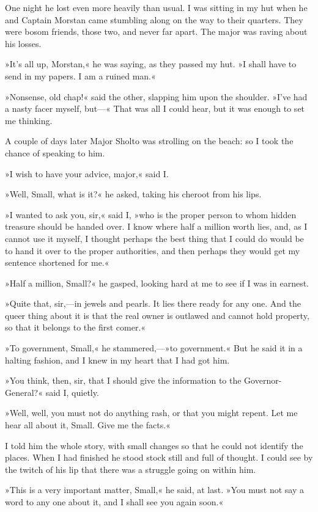 One night he lost even more heavily than usual. I was sitting in my hut when he and Captain Morstan came stumbling along on the way to their quarters. They were bosom friends, those two, and never far apart. The major was raving about his losses.

»It's all up, Morstan,« he was saying, as they passed my hut. »I shall have to send in my papers. I am a ruined man.«

»Nonsense, old chap!« said the other, slapping him upon the shoulder. »I've had a nasty facer myself, but—« That was all I could hear, but it was enough to set me thinking.

A couple of days later Major Sholto was strolling on the beach: so I took the chance of speaking to him.

»I wish to have your advice, major,« said I.

»Well, Small, what is it?« he asked, taking his cheroot from his lips.

»I wanted to ask you, sir,« said I, »who is the proper person to whom hidden treasure should be handed over. I know where half a million worth lies, and, as I cannot use it myself, I thought perhaps the best thing that I could do would be to hand it over to the proper authorities, and then perhaps they would get my sentence shortened for me.«

»Half a million, Small?« he gasped, looking hard at me to see if I was in earnest.

»Quite that, sir,—in jewels and pearls. It lies there ready for any one. And the queer thing about it is that the real owner is outlawed and cannot hold property, so that it belongs to the first comer.«

»To government, Small,« he stammered,—»to government.« But he said it in a halting fashion, and I knew in my heart that I had got him.

»You think, then, sir, that I should give the information to the Governor-General?« said I, quietly.

»Well, well, you must not do anything rash, or that you might repent. Let me hear all about it, Small. Give me the facts.«

I told him the whole story, with small changes so that he could not identify the places. When I had finished he stood stock still and full of thought. I could see by the twitch of his lip that there was a struggle going on within him.

»This is a very important matter, Small,« he said, at last. »You must not say a word to any one about it, and I shall see you again soon.«

